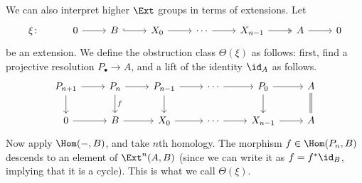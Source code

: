 \documentclass[main.tex]{subfiles}
\begin{document}
We can also interpret higher $\Ext$ groups in terms of extensions. Let
\begin{equation*}
  \begin{tikzcd}
    \xi\colon
    & 0
    \arrow[r]
    & B
    \arrow[r, hook]
    & X_{0}
    \arrow[r]
    & \cdots
    \arrow[r]
    & X_{n-1}
    \arrow[r, two heads]
    & A
    \arrow[r]
    & 0
  \end{tikzcd}
\end{equation*}
be an extension. We define the obstruction class $\Theta(\xi)$ as follows: first, find a projective resolution $P_{\bullet} \to A$, and a lift of the identity $\id_{A}$ as follows.
\begin{equation*}
  \begin{tikzcd}
    P_{n+1}
    \arrow[r]
    \arrow[d]
    & P_{n}
    \arrow[r]
    \arrow[d, "f"]
    & P_{n-1}
    \arrow[r]
    \arrow[d]
    & \cdots
    \arrow[r]
    & P_{0}
    \arrow[r]
    \arrow[d]
    & A
    \arrow[d, equals]
    \\
    0
    \arrow[r]
    & B
    \arrow[r]
    & X_{0}
    \arrow[r]
    & \cdots
    \arrow[r]
    & X_{n-1}
    \arrow[r]
    & A
  \end{tikzcd}
\end{equation*}
Now apply $\Hom(-, B)$, and take $n$th homology. The morphism $f \in \Hom(P_{n}, B)$ descends to an element of $\Ext^{n}(A, B)$ (since we can write it as $f = f^{*} \id_{B}$, implying that it is a cycle). This is what we call $\Theta(\xi)$.
\end{document}
